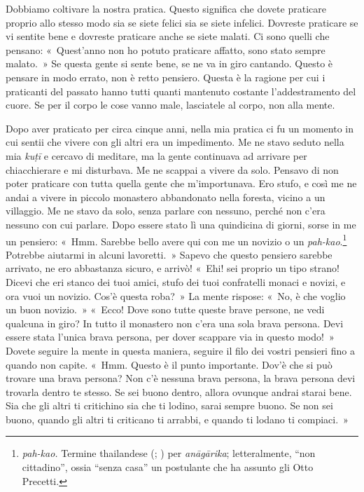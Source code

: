 Dobbiamo coltivare la nostra pratica. Questo significa che dovete
praticare proprio allo stesso modo sia se siete felici sia se siete
infelici. Dovreste praticare se vi sentite bene e dovreste praticare
anche se siete malati. Ci sono quelli che pensano: «~Quest'anno non ho
potuto praticare affatto, sono stato sempre malato.~» Se questa gente si
sente bene, se ne va in giro cantando. Questo è pensare in modo errato,
non è retto pensiero. Questa è la ragione per cui i praticanti del
passato hanno tutti quanti mantenuto costante l'addestramento del cuore.
Se per il corpo le cose vanno male, lasciatele al corpo, non alla mente.

Dopo aver praticato per circa cinque anni, nella mia pratica ci fu un
momento in cui sentii che vivere con gli altri era un impedimento. Me ne
stavo seduto nella mia \emph{kuṭī} e cercavo di meditare, ma la gente
continuava ad arrivare per chiacchierare e mi disturbava. Me ne scappai
a vivere da solo. Pensavo di non poter praticare con tutta quella gente
che m'importunava. Ero stufo, e così me ne andai a vivere in piccolo
monastero abbandonato nella foresta, vicino a un villaggio. Me ne stavo
da solo, senza parlare con nessuno, perché non c'era nessuno con cui
parlare. Dopo essere stato lì una quindicina di giorni, sorse in me un
pensiero: «~Hmm. Sarebbe bello avere qui con me un novizio o un
\emph{pah-kao}.\footnote{\emph{pah-kao.} Termine thailandese (;
  ) per \emph{anāgārika}; letteralmente, ``non cittadino'', ossia
  ``senza casa'' un postulante che ha assunto gli Otto Precetti.}
Potrebbe aiutarmi in alcuni lavoretti.~» Sapevo che questo pensiero
sarebbe arrivato, ne ero abbastanza sicuro, e arrivò! «~Ehi! sei proprio
un tipo strano! Dicevi che eri stanco dei tuoi amici, stufo dei tuoi
confratelli monaci e novizi, e ora vuoi un novizio. Cos'è questa roba?~»
La mente rispose: «~No, è che voglio un buon novizio.~» «~Ecco! Dove
sono tutte queste brave persone, ne vedi qualcuna in giro? In tutto il
monastero non c'era una sola brava persona. Devi essere stata l'unica
brava persona, per dover scappare via in questo modo!~» Dovete seguire
la mente in questa maniera, seguire il filo dei vostri pensieri fino a
quando non capite. «~Hmm. Questo è il punto importante. Dov'è che si può
trovare una brava persona? Non c'è nessuna brava persona, la brava
persona devi trovarla dentro te stesso. Se sei buono dentro, allora
ovunque andrai starai bene. Sia che gli altri ti critichino sia che ti
lodino, sarai sempre buono. Se non sei buono, quando gli altri ti
criticano ti arrabbi, e quando ti lodano ti compiaci.~»

